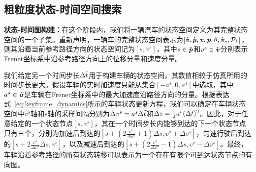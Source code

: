     







\subsection{粗粒度状态-时间空间搜索}
\label{section:keyframe_coarseopt}

\textbf{状态-时间图构建：}在这个阶段内，我们将一辆汽车的状态空间定义为其完整状态空间的一个子集。重新声明，一辆车的完整状态空间表示为$[\hat{\textbf{\emph{v}}}, \hat{\textbf{\emph{p}}}, \textbf{\emph{v}}, \textbf{\emph{p}}, \theta, \hat{\textbf{\emph{v}}}_{o}, \mathcal{P}_{k}]$，则其沿着当前参考路径方向的状态空间记为$[s, v^s]$，其中$s\in\hat{\textbf{\emph{p}}}$和$v^s\in\hat{\textbf{\emph{v}}}$分别表示Frenet坐标系中沿参考路径方向上的位移分量和速度分量。

我们给定另一个时间步长$\Delta \Tilde{t}$用于构建车辆的状态空间，其数值相较于仿真所用的时间步长更大。假设车辆的实时加速度只能从集合$[-a^s, 0, a^s]$中选取，其中$a^s\in\hat{\textbf{\emph{a}}}$是车辆在Frenet坐标系中的最大加速度沿路径方向的分量。根据表达式~\ref{eq:keyframe_dynamics}所示的车辆状态更新方程，我们可以确定在车辆状态空间中$v^s$轴和$s$轴的采样间隔分别为$\Delta{v^s}=a^s\Delta{\Tilde{t}}$和$\Delta{s}=\frac{1}{2}a^s(\Delta{\Tilde{t}})^2$。因此，对于任意给定的一个状态节点$[s, v^s]$，其在一个时间步长内能够到达的下一个状态节点只有三个，分别为加速后到达的$[s+(2\frac{v^s}{\Delta{v}^s}+1)\Delta{s}, v^s + \Delta{v}^s]$，匀速行驶后到达的$[s+2\frac{v^s}{\Delta{v}^s}\Delta{s}, v^s]$，以及减速后到达的$[s+(2\frac{v^s}{\Delta{v}^s}-1)\Delta{s}, v^s - \Delta{v}^s]$。最终，车辆沿着参考路径的所有状态转移可以表示为一个存在有限个可到达状态节点的有向图。


